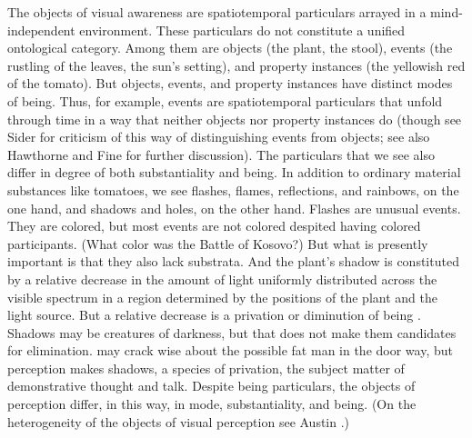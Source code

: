 \documentclass[12pt]{article}
\begin{document}
The objects of visual awareness are spatiotemporal particulars arrayed in a mind-independent environment. These particulars do not constitute a unified ontological category. Among them are objects (the plant, the stool), events (the rustling of the leaves, the sun's setting), and property instances (the yellowish red of the tomato). But objects, events, and property instances have distinct modes of being. Thus, for example, events are spatiotemporal particulars that unfold through time in a way that neither objects nor property instances do (though see Sider \citeyear{Sider:1997fk} for criticism of this way of distinguishing events from objects; see also Hawthorne \citeyear{Hawthorne:2008uq} and Fine \citeyear{Fine:2006fk} for further discussion). The particulars that we see also differ in degree of both substantiality and being. In addition to ordinary material substances like tomatoes, we see flashes, flames, reflections, and rainbows, on the one hand, and shadows and holes, on the other hand. Flashes are unusual events. They are colored, but most events are not colored despited having colored participants. (What color was the Battle of Kosovo?) But what is presently important is that they also lack substrata. And the plant's shadow is constituted by a relative decrease in the amount of light uniformly distributed across the visible spectrum in a region determined by the positions of the plant and the light source. But a relative decrease is a privation or diminution of being \citep[see][]{Sorensen:2008kx}. Shadows may be creatures of darkness, but that does not make them candidates for elimination. \citet{Quine:1948ef} may crack wise about the possible fat man in the door way, but perception makes shadows, a species of privation, the subject matter of demonstrative thought and talk. Despite being particulars, the objects of perception differ, in this way, in mode, substantiality, and being. (On the heterogeneity of the objects of visual perception see Austin \citeyear{Austin:1962lr}.) %
\end{document}
